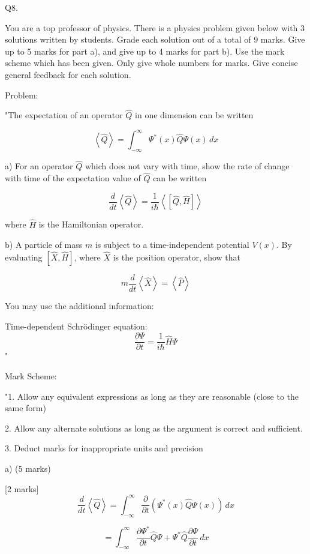                            Q8. 

You are a top professor of physics. There is a physics problem given below with 3 solutions written by students. Grade each solution out of a total of 9 marks. Give up to 5 marks for part a), and give up to 4 marks for part b). Use the mark scheme which has been given. Only give whole numbers for marks. Give concise general feedback for each solution. 

Problem:

"The expectation of an operator \( \hat{Q} \) in one dimension can be written 

\[ \left< \hat{Q} \right> = \int_{-\infty}^{\infty} \Psi^{*}(x) \hat{Q} \Psi(x) \, dx \]

a) For an operator \( \hat{Q} \) which does not vary with time, show the rate of change with time of the expectation value of \( \hat{Q} \) can be written

\[ \frac{d}{dt}\left<\hat{Q}\right> = \frac{1}{i\hbar}\left< \left[ \hat{Q}, \hat{H} \right] \right> \]

where \( \hat{H} \) is the Hamiltonian operator. 

b) A particle of mass \( m \) is subject to a time-independent potential \( V(x) \). By evaluating \( \left[ \hat{X}, \hat{H}\right] \), where \( \hat{X} \) is the position operator, show that 

\[ m\frac{d}{dt}\left<\hat{X}\right> = \left<\hat{P}\right> \]

You may use the additional information: 

Time-dependent Schrödinger equation: 
\[ \frac{\partial\Psi}{\partial t} = \frac{1}{i\hbar}\hat{H}\Psi \]"

Mark Scheme:

"1. Allow any equivalent expressions as long as they are reasonable (close to the same form)

2. Allow any alternate solutions as long as the argument is correct and sufficient. 

3. Deduct marks for inappropriate units and precision

a) (5 marks)

[2 marks] \[ \frac{d}{dt} \left< \hat{Q} \right> = \int_{-\infty}^{\infty} \frac{\partial}{\partial t} \left( \Psi^{*}(x) \hat{Q} \Psi(x) \right) \, dx \]

\[ = \int_{-\infty}^{\infty} \frac{\partial \Psi^{*}}{\partial t}\hat{Q}\Psi + \Psi^{*}\hat{Q}\frac{\partial \Psi}{\partial t} \, dx \]

